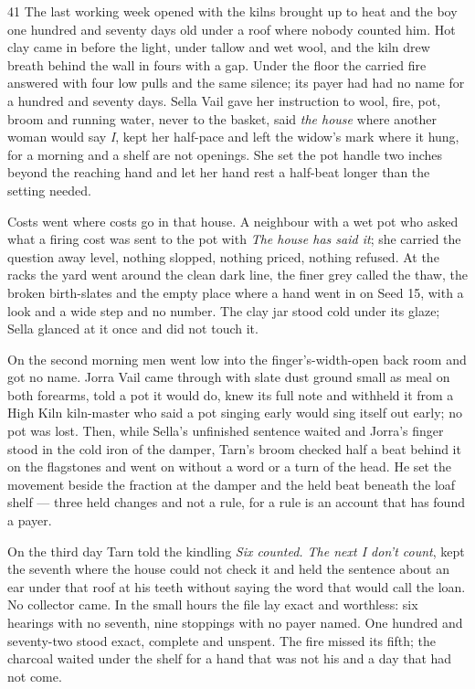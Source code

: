 \begin{CRchronicle}{41}
The last working week opened with the kilns brought up to heat and the boy one hundred and seventy days old under a roof where nobody counted him. Hot clay came in before the light, under tallow and wet wool, and the kiln drew breath behind the wall in fours with a gap. Under the floor the carried fire answered with four low pulls and the same silence; its payer had had no name for a hundred and seventy days. Sella Vail gave her instruction to wool, fire, pot, broom and running water, never to the basket, said \emph{the house} where another woman would say \emph{I}, kept her half-pace and left the widow’s mark where it hung, for a morning and a shelf are not openings. She set the pot handle two inches beyond the reaching hand and let her hand rest a half-beat longer than the setting needed.

Costs went where costs go in that house. A neighbour with a wet pot who asked what a firing cost was sent to the pot with \emph{The house has said it}; she carried the question away level, nothing slopped, nothing priced, nothing refused. At the racks the yard went around the clean dark line, the finer grey called the thaw, the broken birth-slates and the empty place where a hand went in on Seed 15, with a look and a wide step and no number. The clay jar stood cold under its glaze; Sella glanced at it once and did not touch it.

On the second morning men went low into the finger’s-width-open back room and got no name. Jorra Vail came through with slate dust ground small as meal on both forearms, told a pot it would do, knew its full note and withheld it from a High Kiln kiln-master who said a pot singing early would sing itself out early; no pot was lost. Then, while Sella’s unfinished sentence waited and Jorra’s finger stood in the cold iron of the damper, Tarn’s broom checked half a beat behind it on the flagstones and went on without a word or a turn of the head. He set the movement beside the fraction at the damper and the held beat beneath the loaf shelf --- three held changes and not a rule, for a rule is an account that has found a payer.

On the third day Tarn told the kindling \emph{Six counted. The next I don’t count}, kept the seventh where the house could not check it and held the sentence about an ear under that roof at his teeth without saying the word that would call the loan. No collector came. In the small hours the file lay exact and worthless: six hearings with no seventh, nine stoppings with no payer named. One hundred and seventy-two stood exact, complete and unspent. The fire missed its fifth; the charcoal waited under the shelf for a hand that was not his and a day that had not come.
\end{CRchronicle}
